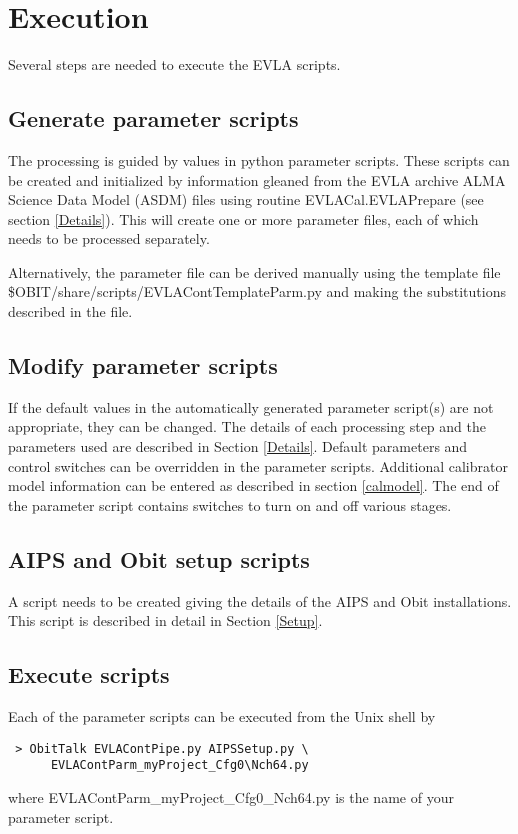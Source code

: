 \documentclass[11pt]{article}
\begin{document}
\section{Execution}
Several steps are needed to execute the EVLA scripts.
\subsection{Generate parameter scripts}
The processing is guided by values in python parameter scripts.
These scripts can be created and initialized by information gleaned from
the EVLA archive ALMA Science Data Model (ASDM) files using routine
EVLACal.EVLAPrepare (see section \ref{Details}).
This will create one or more parameter files, each of which needs to
be processed separately.

Alternatively, the parameter file can be derived manually using the
template file \$OBIT/share/scripts/EVLAContTemplateParm.py and making
the substitutions described in the file.

\subsection{Modify parameter scripts}
If the default values in the automatically generated parameter
script(s) are not appropriate, they can be changed.
The details of each processing step and the parameters used are
described in Section \ref{Details}.
Default parameters and control switches can be overridden in the
parameter scripts.
Additional calibrator model information can be entered as described in
section \ref{calmodel}.
The end of the parameter script contains switches to turn on and off
various stages.

\subsection{AIPS and Obit setup scripts}
A script needs to be created giving the details of the AIPS and Obit
installations. 
This script is described in detail in Section \ref{Setup}.

\subsection{Execute scripts}
Each of the parameter scripts can be executed from the Unix shell by
\begin{verbatim}
 > ObitTalk EVLAContPipe.py AIPSSetup.py \
      EVLAContParm_myProject_Cfg0\Nch64.py
\end{verbatim}
where EVLAContParm\_myProject\_Cfg0\_Nch64.py is the name of your
parameter script.
\end{document}
